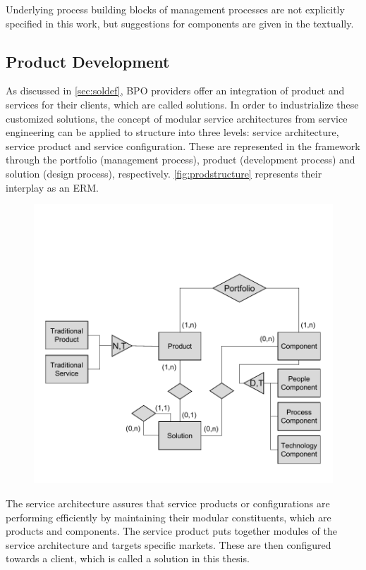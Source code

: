	Underlying process building blocks of management processes are not explicitly specified in this work, but suggestions for components are given in the textually. 
	
	\subsection{Product Development}
	\label{sec:proddev}
	
	As discussed in \ref{sec:soldef}, \acrshort{BPO} providers offer an integration of product and services for their clients, which are called solutions. In order to industrialize these customized solutions, the concept of modular service architectures from service engineering \citep{Bohmann2006} can be applied to structure into three levels: service architecture, service product and service configuration. These are represented in the framework through the portfolio (management process), product (development process) and solution (design process), respectively. \Fig \ref{fig:prodstructure} represents their interplay as an \acrshort{ERM}. 
	
	\begin{figure}[caption={Solution-Product-Portfolio Structure }, label={fig:prodstructure}]
		{	\includegraphics[width=.8\textwidth]{figures/producterm.pdf}}
		
	\end{figure} 
	
	The service architecture assures that service products or configurations are performing efficiently by maintaining their modular constituents, which are products and components. The service product puts together modules of the service architecture and targets specific markets. These are then configured towards a client, which is called a solution in this thesis. 
	
